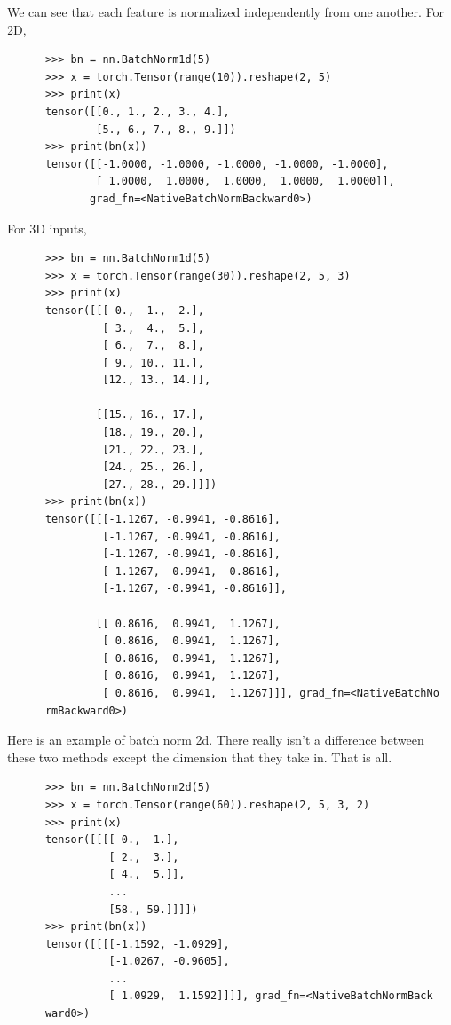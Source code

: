 \documentclass{article}
\begin{document}
  \begin{example}
    We can see that each feature is normalized independently from one another. For 2D, 
    \begin{lstlisting}
      >>> bn = nn.BatchNorm1d(5)
      >>> x = torch.Tensor(range(10)).reshape(2, 5)
      >>> print(x) 
      tensor([[0., 1., 2., 3., 4.],
              [5., 6., 7., 8., 9.]])
      >>> print(bn(x))
      tensor([[-1.0000, -1.0000, -1.0000, -1.0000, -1.0000],
              [ 1.0000,  1.0000,  1.0000,  1.0000,  1.0000]],
             grad_fn=<NativeBatchNormBackward0>)
    \end{lstlisting}
    For 3D inputs, 
    \begin{lstlisting}
      >>> bn = nn.BatchNorm1d(5)
      >>> x = torch.Tensor(range(30)).reshape(2, 5, 3)
      >>> print(x) 
      tensor([[[ 0.,  1.,  2.],
               [ 3.,  4.,  5.],
               [ 6.,  7.,  8.],
               [ 9., 10., 11.],
               [12., 13., 14.]],

              [[15., 16., 17.],
               [18., 19., 20.],
               [21., 22., 23.],
               [24., 25., 26.],
               [27., 28., 29.]]])
      >>> print(bn(x))
      tensor([[[-1.1267, -0.9941, -0.8616],
               [-1.1267, -0.9941, -0.8616],
               [-1.1267, -0.9941, -0.8616],
               [-1.1267, -0.9941, -0.8616],
               [-1.1267, -0.9941, -0.8616]],

              [[ 0.8616,  0.9941,  1.1267],
               [ 0.8616,  0.9941,  1.1267],
               [ 0.8616,  0.9941,  1.1267],
               [ 0.8616,  0.9941,  1.1267],
               [ 0.8616,  0.9941,  1.1267]]], grad_fn=<NativeBatchNo
      rmBackward0>)
    \end{lstlisting}
  \end{example}

  \begin{example}
    Here is an example of batch norm 2d. There really isn't a difference between these two methods except the dimension that they take in. That is all. 
    \begin{lstlisting}
      >>> bn = nn.BatchNorm2d(5)
      >>> x = torch.Tensor(range(60)).reshape(2, 5, 3, 2)
      >>> print(x) 
      tensor([[[[ 0.,  1.],
                [ 2.,  3.],
                [ 4.,  5.]],
                ...
                [58., 59.]]]])
      >>> print(bn(x))
      tensor([[[[-1.1592, -1.0929],
                [-1.0267, -0.9605],
                ...
                [ 1.0929,  1.1592]]]], grad_fn=<NativeBatchNormBack
      ward0>)
    \end{lstlisting}
  \end{example}
\end{document}
